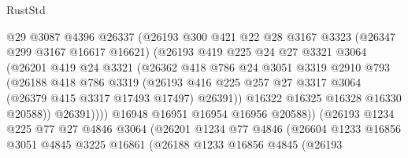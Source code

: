 \begin{lexlean}{RustStd}
\begin{coremodule}
                        @29
                        @3087
                        @4396
                        @26337
                        (@26193
                          @300
                          @421
                          @22
                          @28
                          @3167
                          @3323
                          (@26347 @299 @3167 @16617 @16621)
                          (@26193
                            @419
                            @225
                            @24
                            @27
                            @3321
                            @3064
                            (@26201
                              @419
                              @24
                              @3321
                              (@26362
                                @418
                                @786
                                @24
                                @3051
                                @3319
                                @2910
                                @793
                                (@26188
                                  @418
                                  @786
                                  @3319
                                  (@26193
                                    @416
                                    @225
                                    @257
                                    @27
                                    @3317
                                    @3064
                                    (@26379 @415 @3317 @17493 @17497)
                                    @26391))
                                @16322
                                @16325
                                @16328
                                @16330
                                @20588))
                            @26391))))
                    @16948
                    @16951
                    @16954
                    @16956
                    @20588))
                (@26193
                  @1234
                  @225
                  @77
                  @27
                  @4846
                  @3064
                  (@26201
                    @1234
                    @77
                    @4846
                    (@26604
                      @1233
                      @16856
                      @3051
                      @4845
                      @3225
                      @16861
                      (@26188
                        @1233
                        @16856
                        @4845
                        (@26193

\end{coremodule}
\end{lexlean}

